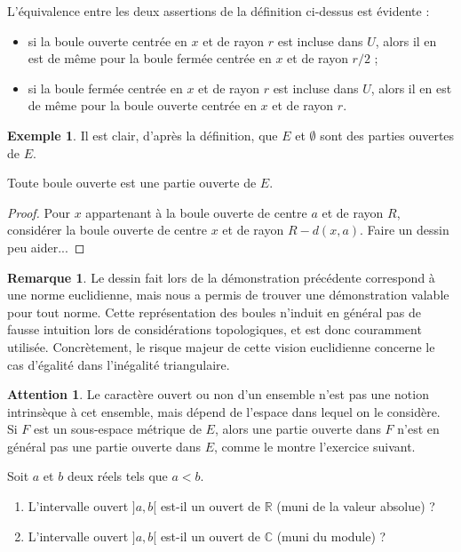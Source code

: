 \documentclass[french]{article}
\newcommand{\R}{\mathbb{R}}
\newcommand{\C}{\mathbb{C}}
\theoremstyle{plain}
\theoremstyle{definition}
\newtheorem*{ex}{Exemple}
\newtheorem*{rmq}{Remarque}
\newtheorem*{attention}{Attention}
\theoremstyle{remark}
\begin{document}
L'équivalence entre les deux assertions de la définition ci-dessus est évidente :
\begin{itemize}
	\item si la boule ouverte centrée en $x$ et de rayon $r$ est incluse dans $U$, alors il en est de même pour la boule fermée centrée en $x$ et de rayon $r/2$ ;
	\item si la boule fermée centrée en $x$ et de rayon $r$ est incluse dans $U$, alors il en est de même pour la boule ouverte centrée en $x$ et de rayon $r$.
\end{itemize}

\begin{ex}
	Il est clair, d'après la définition, que $E$ et $\emptyset$ sont des parties ouvertes de $E$.
\end{ex}

\begin{prop}%
	Toute boule ouverte est une partie ouverte de $E$.
\end{prop}

\begin{proof}
	Pour $x$ appartenant à la boule ouverte de centre $a$ et de rayon $R$, considérer la boule ouverte de centre $x$ et de rayon $R-d(x,a)$. Faire un dessin peu aider...
\end{proof}

\begin{rmq}
	Le dessin fait lors de la démonstration précédente correspond à une norme euclidienne, mais nous a permis de trouver une démonstration valable pour tout norme. Cette représentation des boules n'induit en général pas de fausse intuition lors de considérations topologiques, et est donc couramment utilisée. Concrètement, le risque majeur de cette vision euclidienne concerne le cas d'égalité dans l'inégalité triangulaire.
\end{rmq}

\begin{attention}
	Le caractère ouvert ou non d'un ensemble n'est pas une notion intrinsèque à cet ensemble, mais dépend de l'espace dans lequel on le considère. Si $F$ est un sous-espace métrique de $E$, alors une partie ouverte dans $F$ n'est en général pas une partie ouverte dans $E$, comme le montre l'exercice suivant.
\end{attention}

\begin{exo}
	Soit $a$ et $b$ deux réels tels que $a<b$.
	\begin{enumerate}
		\item L'intervalle ouvert $]a,b[$ est-il un ouvert de $\R$ (muni de la valeur absolue) ?
		\item L'intervalle ouvert $]a,b[$ est-il un ouvert de $\C$ (muni du module) ?
	\end{enumerate}
\end{exo}
\end{document}
